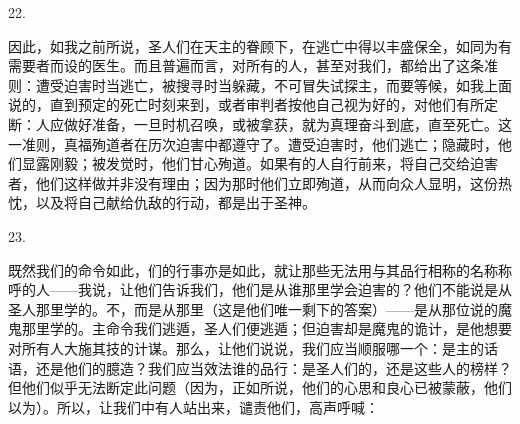 22. \par

因此，如我之前所说，圣人们在天主的眷顾下，在逃亡中得以丰盛保全，如同为有需要者而设的医生。而且普遍而言，对所有的人，甚至对我们，都给出了这条准则：遭受迫害时当逃亡，被搜寻时当躲藏，不可冒失试探主，而要等候，如我上面说的，直到预定的死亡时刻来到，或者审判者按他自己视为好的，对他们有所定断：人应做好准备，一旦时机召唤，或被拿获，就为真理奋斗到底，直至死亡。这一准则，真福殉道者在历次迫害中都遵守了。遭受迫害时，他们逃亡；隐藏时，他们显露刚毅；被发觉时，他们甘心殉道。如果有的人自行前来，将自己交给迫害者，他们这样做并非没有理由；因为那时他们立即殉道，从而向众人显明，这份热忱，以及将自己献给仇敌的行动，都是出于圣神。\par

23. \par

既然我们的命令如此，们的行事亦是如此，就让那些无法用与其品行相称的名称称呼的人——我说，让他们告诉我们，他们是从谁那里学会迫害的？他们不能说是从圣人那里学的。不，而是从那里（这是他们唯一剩下的答案）——是从那位说的魔鬼那里学的。主命令我们逃遁，圣人们便逃遁；但迫害却是魔鬼的诡计，是他想要对所有人大施其技的计谋。那么，让他们说说，我们应当顺服哪一个：是主的话语，还是他们的臆造？我们应当效法谁的品行：是圣人们的，还是这些人的榜样？但他们似乎无法断定此问题（因为，正如所说，他们的心思和良心已被蒙蔽，他们以为）。所以，让我们中有人站出来，谴责他们，高声呼喊：\par

\par

